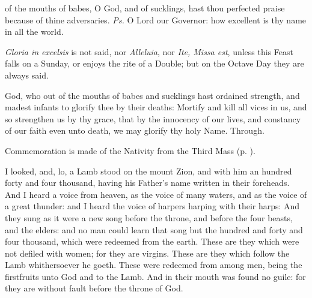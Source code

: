

\properantiphonfix

\introit
{} of the mouths of babes, O God, and of sucklings, hast thou perfected praise because of thine adversaries. \textit{Ps.} O Lord our Governor: how excellent is thy name in all the world.
\begin{rubric}
    \emph{Gloria in excelsis} is not said, nor \emph{Alleluia}, nor \emph{Ite, Missa est}, unless this Feast falls on a Sunday, or enjoys the rite of a  Double; but on the Octave Day they are always said.
\end{rubric}
\collect
{} God, who out of the mouths of babes and sucklings hast ordained strength, and madest infants to glorify thee by their deaths: Mortify and kill all vices in us, and so strengthen us by thy grace, that by the innocency of our lives, and constancy of our faith even unto death, we may glorify thy holy Name. Through.
\begin{rubric}
    Commemoration is made of the Nativity from the Third Mass (p. \pageref{NativityMassIIICollect}).
\end{rubric}
 I looked, and, lo, a Lamb stood on the mount Zion, and with him an hundred forty and four thousand, having his Father's name written in their foreheads. And I heard a voice from heaven, as the voice of many waters, and as the voice of a great thunder: and I heard the voice of harpers harping with their harps: And they sung as it were a new song before the throne, and before the four beasts, and the elders: and no man could learn that song but the hundred and forty and four thousand, which were redeemed from the earth. These are they which were not defiled with women; for they are virgins. These are they which follow the Lamb whithersoever he goeth. These were redeemed from among men, being the firstfruits unto God and to the Lamb. And in their mouth was found no guile: for they are without fault before the throne of God.
